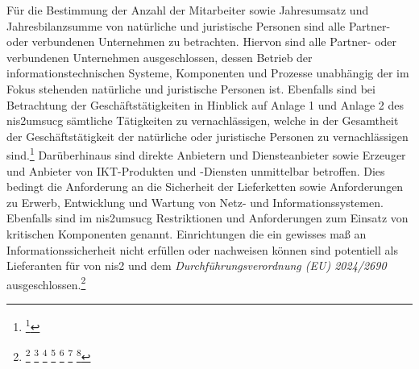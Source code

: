 \documentclass[11pt,a4paper,hidelinks]{article}   %
\begin{document}
        Für die Bestimmung der Anzahl der Mitarbeiter sowie Jahresumsatz und Jahresbilanzsumme von natürliche und juristische Personen sind alle Partner- oder verbundenen Unternehmen zu betrachten. Hiervon sind alle Partner- oder verbundenen Unternehmen ausgeschlossen, dessen Betrieb der informationstechnischen Systeme, Komponenten und Prozesse unabhängig der im Fokus stehenden natürliche und juristische Personen ist. Ebenfalls sind bei Betrachtung der Geschäftstätigkeiten in Hinblick auf Anlage 1 und Anlage 2 des \gls{nis2umsucg} sämtliche Tätigkeiten zu vernachlässigen, welche in der Gesamtheit der Geschäftstätigkeit der natürliche oder juristische Personen zu vernachlässigen sind.\footnote{
            \footcite[Vgl.][, §28 Absatz 4 \& 3]{NIS2UmsuCG}
        }\medbreak
        Darüberhinaus sind direkte Anbietern und Diensteanbieter sowie Erzeuger und Anbieter von IKT-Produkten und -Diensten unmittelbar betroffen. Dies bedingt die Anforderung an die Sicherheit der Lieferketten sowie Anforderungen zu Erwerb, Entwicklung und Wartung von Netz- und Informationssystemen. Ebenfalls sind im \gls{nis2umsucg} Restriktionen und Anforderungen zum Einsatz von kritischen Komponenten genannt. Einrichtungen die ein gewisses maß an Informationssicherheit nicht erfüllen oder nachweisen können sind potentiell als Lieferanten für von \gls{nis2} und dem \emph{Durchführungsverordnung (EU) 2024/2690} ausgeschlossen.\footnote{
            \footcite[Vgl.][, §30 Absatz 6]{NIS2UmsuCG} %
            \footcite[Vgl.][§56 Absatz 3]{NIS2UmsuCG}
            \footcite[Vgl.][, Anhang, Nummer 5.1.1. \& 5.1.2.]{EU2024-2690}
            \footcite[Vgl.][, Anhang, Nummer 5.1.4. \& 5.1.5.]{EU2024-2690}
            \footcite[Vgl.][, Anhang, Nummer 6.1.1. \& 6.1.2.]{EU2024-2690}
            \footcite[Vgl.][, Anhang, Nummer 6.1.1. \& 6.1.2.]{EU2024-2690}
            \footcite[Vgl.][, Anhang, Nummer 6.2.2 \& 6.2.3.]{EU2024-2690}
        }
\end{document}

